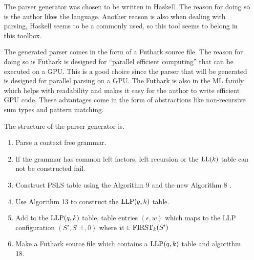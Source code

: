 The parser generator was chosen to be written in Haskell. The reason for doing so is the author likes the language. Another reason is also when dealing with parsing, Haskell seems to be a commonly used, so this tool seems to belong in this toolbox.

The generated parser comes in the form of a Futhark source file. The reason for doing so is Futhark is designed for ``parallel efficient computing'' \cite{futhark:homepage} that can be executed on a GPU. This is a good choice since the parser that will be generated is designed for parallel parsing on a GPU. The Futhark is also in the ML family which helps with readability and makes it easy for the author to write efficient GPU code. These advantages come in the form of abstractions like non-recursive sum types and pattern matching.

The structure of the parser generator is.
\begin{enumerate}
    \item Parse a context free grammar.
    \item If the grammar has common left factors, left recursion or the $\text{LL}(k)$ table can not be constructed fail.
    \item Construct PSLS table using the Algorithm 9 and the new Algorithm 8 \cite[13]{Vagner2007}.
    \item Use Algorithm 13 \cite[13]{Vagner2007} to construct the $\text{LLP}(q, k)$ table.
    \item Add to the $\text{LLP}(q, k)$ table, table entries $(\epsilon, w)$ which maps to the LLP configuration $(S', S \dashv, 0)$ where $w \in \text{FIRST}_k(S')$
    \item Make a Futhark source file which contains a $\text{LLP}(q, k)$ table and algorithm 18.
\end{enumerate}